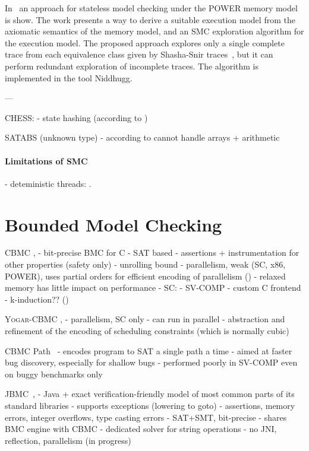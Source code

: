 
In~\cite{Abdulla2016} an approach for stateless model checking under the POWER memory model is show.
The work presents a way to derive a suitable execution model from the axiomatic semantics of the memory model, and an SMC exploration algorithm for the execution model.
The proposed approach explores only a single complete trace from each equivalence class given by Shasha-Snir traces~\cite{Shasha1988}, but it can perform redundant exploration of incomplete traces. 
The algorithm is implemented in the tool Niddhugg.


---

CHESS:
- state hashing (according to \cite{Cordeiro2011})


SATABS (unknown type)
- according to \cite{Cordeiro2011} cannot handle arrays + arithmetic



\paragraph{Limitations of SMC}

- deteministic threads: \cite{Huang2015:14,Huang2015:27}.


\section{Bounded Model Checking}


CBMC \cite{Kroening2014}, \cite{Clarke2004}
- bit-precise BMC for C
- SAT based
- assertions + instrumentation for other properties (safety only)
- unrolling bound
- parallelism, weak (SC, x86, POWER), uses partial orders  for efficient encoding of parallelism \cite{Alglave2013por} ()
- relaxed memory has little impact on performance
- SC: \cite{Alglave2013por:25}
- SV-COMP
- custom C frontend
- k-induction?? (\cite{Gadelha2018:7})

\textsc{Yogar-CBMC} \cite{Yin2018}, \cite{Yin2019}
- parallelism, SC only
- can run in parallel
- abstraction and refinement of the encoding of scheduling constraints (which is normally cubic)

CBMC Path~\cite{Khazem2019}
- encodes program to SAT a single path a time
- aimed at faster bug discovery, especially for shallow bugs
- performed poorly in SV-COMP even on buggy benchmarks only

JBMC~\cite{Cordeiro2019}, \cite{Cordeiro2018}
- Java + exact verification-friendly model of most common parts of its standard libraries
- supports exceptions (lowering to goto)
- assertions, memory errors, integer overflows, type casting errors
- SAT+SMT, bit-precise
- shares BMC engine with CBMC
- dedicated solver for string operations
- no JNI, reflection, parallelism (in progress)

